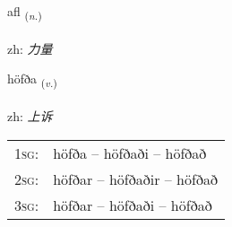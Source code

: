 \documentclass[frontgrid, backgrid]{flacards}\usepackage[]{graphicx}\usepackage[]{color}
\begin{document}
\renewcommand{\flhead}{\vskip5pt \fboxsep=0pt {\small\bfseries\footnotesize Nafnorð | 名词}}
\renewcommand{\fcfoot}{\vskip5pt \fboxsep=0pt \hspace{2pt}{\small\bfseries\footnotesize 2K}}

\renewcommand{\blhead}{\vskip5pt {\small\bfseries\footnotesize Nafnorð | 名词 }}
\renewcommand{\bcfoot}{\vskip5pt \hspace{2pt}{\small\bfseries\footnotesize 2K}}


{afl \small{\textsubscript{(\textit{n.})}} \\[1ex] %
\textphonetic{[apl̥]} \\
zh: \emph{力量} \\  [2ex]
\renewcommand*{\arraystretch}{0.8}
}

\renewcommand{\flhead}{\vskip5pt \fboxsep=0pt {\small\bfseries\footnotesize Sagnorð | 动词}}
\renewcommand{\fcfoot}{\vskip5pt \fboxsep=0pt \hspace{2pt}{\small\bfseries\footnotesize 2K}}

\renewcommand{\blhead}{\vskip5pt {\small\bfseries\footnotesize Sagnorð | 动词 }}
\renewcommand{\bcfoot}{\vskip5pt \hspace{2pt}{\small\bfseries\footnotesize 2K}}


{höfða \small{\textsubscript{(\textit{v.})}} \\[1ex] %
\textphonetic{[hœvða]} \\
zh: \emph{上诉} \\  [2ex]
\renewcommand*{\arraystretch}{0.8}
\begin{tabular}{p{1cm}l}
\textsc{1sg}: & höfða -- höfðaði -- höfðað \\ 
\textsc{2sg}: & höfðar -- höfðaðir -- höfðað \\ 
\textsc{3sg}: & höfðar -- höfðaði -- höfðað \\ 
\end{tabular}
}
\end{document}

